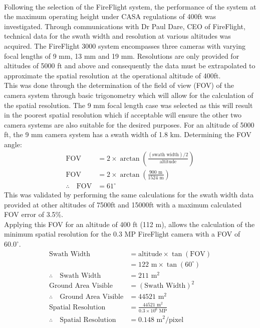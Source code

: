 \\
Following the selection of the FireFlight system, the performance of the system at the maximum operating height under CASA regulations of 400ft was investigated. Through communications with Dr Paul Dare, CEO of FireFlight, technical data for the swath width and resolution at various altitudes was acquired. The FireFlight 3000 system encompasses three cameras with varying focal lengths of 9 mm, 13 mm and 19 mm. Resolutions are only provided for altitudes of 5000 ft and above and consequently the data must be extrapolated to approximate the spatial resolution at the operational altitude of 400ft.\\

This was done through the determination of the field of view (FOV) of the camera system through basic trigonometry which will allow for the calculation of the spatial resolution. The 9 mm focal length case was selected as this will result in the poorest spatial resolution which if acceptable will ensure the other two camera systems are also suitable for the desired purposes.
For an altitude of 5000 ft, the 9 mm camera system has a swath width of 1.8 km. Determining the FOV angle: 
\begin{align*}
    \text{FOV} &= 2\times \arctan \left(\frac{(\text{swath width})/2}{\text{altitude}}\right)\\
    \text{FOV} &= 2\times \arctan \left({\frac{900\text{ m}}{1524\text{ m}}}\right)\\
    \therefore\quad \text{FOV} &= 61^\circ
\end{align*}
This was validated by performing the same calculations for the swath width data provided at other altitudes of 7500ft and 15000ft with a maximum calculated FOV error of 3.5\%. \\

Applying this FOV for an altitude of 400 ft (112 m), allows the calculation of the minimum spatial resolution for the 0.3 MP FireFlight camera with a FOV of $60.0^\circ$.
\begin{align*}
    \text{Swath Width} &= \text{altitude}\times \tan(\text{FOV})\\
    &= 122\text{ m}\times \tan(60^\circ)\\
    \therefore\quad \text{Swath Width} &= 211\text{ m}^2 \\
    \text{Ground Area Visible} &= (\text{Swath Width})^2\\
    \therefore\quad\text{Ground Area Visible} &= 44521\text{ m}^2 \\
    \text{Spatial Resolution} &= \frac{44521\text{ m}^2}{0.3\times10^6\text{ MP}}\\
    \therefore\quad\text{Spatial Resolution} &= 0.148\text{ m$^2/$pixel} 
\end{align*}

